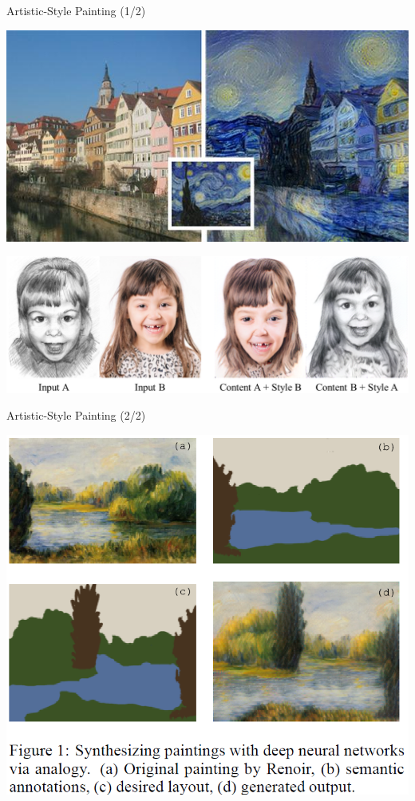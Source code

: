 \documentclass{beamer}
\begin{document}
  {
    \begin{frame}{Artistic-Style Painting (1/2)}
      \begin{center}
        \includegraphics[height=.4\textheight]{../img/art_Van_Gogh.jpg}
        \pause

        \includegraphics[height=.44\textheight]{../img/art_girl.png}
      \end{center}
    \end{frame}
  }

  {
    \begin{frame}{Artistic-Style Painting (2/2)}
      \begin{center}
        \includegraphics[height=.86\textheight,keepaspectratio]{../img/doodle_AI.png}
      \end{center}
    \end{frame}
  }
\end{document}
